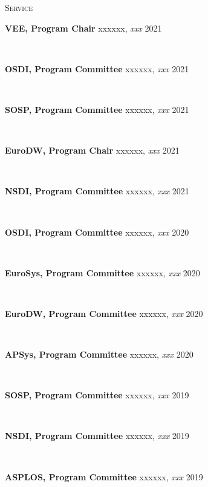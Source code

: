 \documentclass[10pt,times]{report}
\newlength{\sectiongap}
\newlength{\entrygap}
\newlength{\sectioncolwidth}
\newlength{\colgap}
\newlength{\stuffwidth}
\def\ifEqString#1#2{\def\testa{#1}\def\testb{#2}%
  \ifx\testa\testb}
\newenvironment{rtable}{
  \begin{minipage}{\textwidth}
  }{
  \end{minipage}
}
\newenvironment{rentry}[3][xxx]{
  \begin{minipage}[t]{\hsize}
    \textbf{#2}\ifEqString{#1}{xxx}\relax\else, \textit{#1}\fi
    \hspace{\stretch{1}} #3 \\
  }{
    \removelastskip
  \end{minipage}
  \\[\entrygap]  %
}
\newenvironment{rsection}[1]{
  \begin{minipage}[t]{\sectioncolwidth}
    \textsc{#1}
  \end{minipage}
  \hspace{\colgap}
  \begin{minipage}[t]{\stuffwidth}
  }{
    \removelastskip
  \end{minipage}
  \\[\sectiongap]
}
\begin{document}
\begin{rtable}

  \begin{rsection}{Service}
    \begin{rentry}{VEE, Program Chair}{2021}
      \vspace{-0.5em}
    \end{rentry}
    \begin{rentry}{OSDI, Program Committee}{2021}
      \vspace{-0.5em}
    \end{rentry}
    \begin{rentry}{SOSP, Program Committee}{2021}
      \vspace{-0.5em}
    \end{rentry}
    \begin{rentry}{EuroDW, Program Chair}{2021}
      \vspace{-0.5em}
    \end{rentry}
    \begin{rentry}{NSDI, Program Committee}{2021}
      \vspace{-0.5em}
    \end{rentry}
    \begin{rentry}{OSDI, Program Committee}{2020}
      \vspace{-0.5em}
    \end{rentry}
    \begin{rentry}{EuroSys, Program Committee}{2020}
       \vspace{-0.5em}
    \end{rentry}
    \begin{rentry}{EuroDW, Program Committee}{2020}
       \vspace{-0.5em}
    \end{rentry}
    \begin{rentry}{APSys, Program Committee}{2020}
       \vspace{-0.5em}
    \end{rentry}
    \begin{rentry}{SOSP, Program Committee}{2019}
       \vspace{-0.5em}
    \end{rentry}
    \begin{rentry}{NSDI, Program Committee}{2019}
       \vspace{-0.5em}
    \end{rentry}
    \begin{rentry}{ASPLOS, Program Committee}{2019}
       \vspace{-0.5em}

\end{rentry}
\end{rsection}
\end{rtable}
\end{document}
